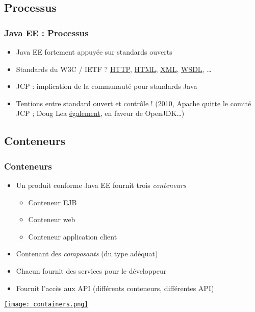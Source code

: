 \documentclass[english, french]{beamer}
\begin{document}
\subsection{Processus}
\begin{frame}
	\frametitle{Java EE : Processus}
	\begin{itemize}
		\item Java EE fortement appuyée sur standards ouverts
		\item Standards du W3C / IETF ?\pause{} \href{http://www.w3.org/Protocols/}{HTTP}, \href{http://www.w3.org/html/}{HTML}, \href{http://www.w3.org/XML/}{XML}, \href{http://www.w3.org/TR/wsdl}{WSDL}, …\pause
		\item JCP : implication de \og{}la communauté\fg{} pour standards Java
		\item Tentions entre standard ouvert et contrôle ! (2010, Apache \href{https://blogs.apache.org/foundation/entry/the_asf_resigns_from_the}{quitte} le comité JCP ; Doug Lea \href{http://gee.cs.oswego.edu/dl/html/jcp22oct10.html}{également}, en faveur de OpenJDK…)
	\end{itemize}
\end{frame}

\subsection{Conteneurs}
\begin{frame}
	\frametitle{Conteneurs}
	\begin{itemize}
		\item Un produit conforme Java EE fournit trois \emph{conteneurs}
		\begin{itemize}
			\item Conteneur EJB
			\item Conteneur web
			\item Conteneur application client
		\end{itemize}
		\item Contenant des \emph{composants} (du type adéquat)
		\item Chacun fournit des services pour le développeur
		\item Fournit l’accès aux API (différents conteneurs, différentes API)
	\end{itemize}
	\href{https://docs.oracle.com/javaee/7/tutorial/overview007.htm}{\texttt{[image: containers.png]}}
\end{frame}
\end{document}
